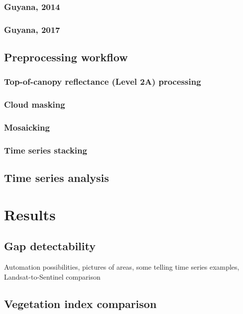 \documentclass[a4paper,12pt]{scrbook}
\begin{document}
\subsection{Guyana, 2014}

\subsection{Guyana, 2017}

\section{Preprocessing workflow}

\subsection{Top-of-canopy reflectance (Level 2A) processing}

\subsection{Cloud masking}

\subsection{Mosaicking}

\subsection{Time series stacking}

\section{Time series analysis}

\chapter{Results}

\section{Gap detectability}

Automation possibilities, pictures of areas, some telling time series examples, Landsat-to-Sentinel comparison

\section{Vegetation index comparison}
\end{document}
